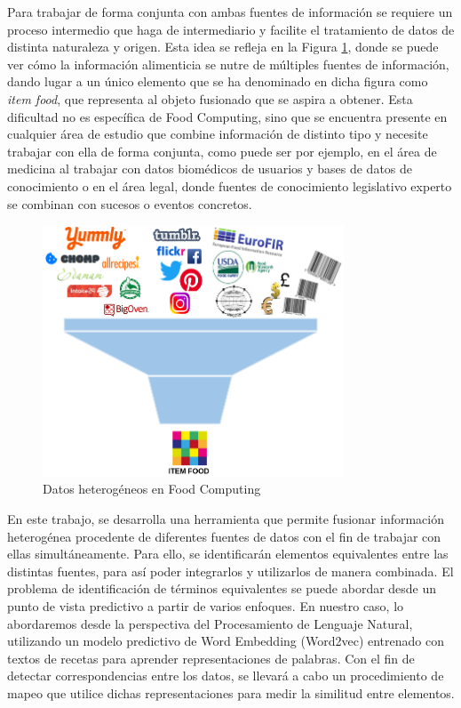 Para trabajar de forma conjunta con ambas fuentes de información se requiere un proceso intermedio que haga de intermediario y facilite el tratamiento de datos de distinta naturaleza y origen. Esta idea se refleja en la Figura \ref{fig:heterogeneos_}, donde se puede ver cómo la información alimenticia se nutre de múltiples fuentes de información, dando lugar a un único elemento que se ha denominado en dicha figura como \textit{item food}, que representa al objeto fusionado que se aspira a obtener. Esta dificultad no es específica de Food Computing, sino que se encuentra presente en cualquier área de estudio que combine información de distinto tipo y necesite trabajar con ella de forma conjunta, como puede ser por ejemplo, en el área de medicina al trabajar con datos biomédicos de usuarios y bases de datos de conocimiento o en el área legal, donde fuentes de conocimiento legislativo experto se combinan con sucesos o eventos concretos. 

\begin{figure}[H]
    \centering
    \includegraphics[width=0.8\textwidth]{imagenes/IMAGE.png}
    \caption{Datos heterogéneos en Food Computing}
    \label{fig:heterogeneos_}
\end{figure}

En este trabajo, se desarrolla una herramienta que permite fusionar información heterogénea procedente de diferentes fuentes de datos con el fin de trabajar con ellas simultáneamente. Para ello, se identificarán elementos equivalentes entre las distintas fuentes, para así poder integrarlos y utilizarlos de manera combinada. El problema de identificación de términos equivalentes se puede abordar desde un punto de vista predictivo a partir de varios enfoques. En nuestro caso, lo abordaremos desde la perspectiva del Procesamiento de Lenguaje Natural, utilizando un modelo predictivo de Word Embedding (Word2vec) entrenado con textos de recetas para aprender representaciones de palabras. Con el fin de detectar correspondencias entre los datos, se llevará a cabo un procedimiento de mapeo que utilice dichas representaciones para medir la similitud entre elementos.

